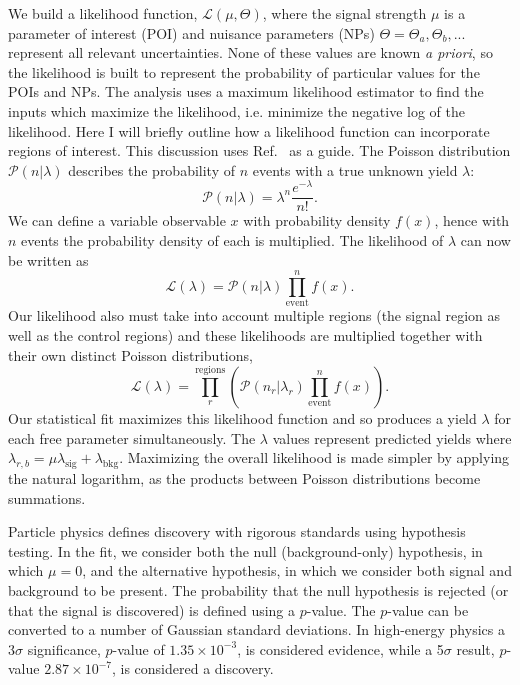 We build a likelihood function, $\mathcal{L}(\mu,\Theta)$, where the signal strength $\mu$ is a parameter of interest (POI) and nuisance parameters (NPs) $\Theta=\Theta_a,\Theta_b,...$ represent all relevant uncertainties. None of these values are known \textit{a priori}, so the likelihood is built to represent the probability of particular values for the POIs and NPs. The analysis uses a maximum likelihood estimator to find the inputs which maximize the likelihood, i.e. minimize the negative log of the likelihood. Here I will briefly outline how a likelihood function can incorporate regions of interest. This discussion uses Ref.~\cite{cranmer2015practical} as a guide. The Poisson distribution $\mathcal{P}(n|\lambda)$ describes the probability of $n$ events with a true unknown yield $\lambda$:
\begin{equation}
\mathcal{P}(n|\lambda)= \lambda^n\frac{e^{-\lambda}}{n!}.
\end{equation}
We can define a variable observable $x$ with probability density $f(x)$, hence with $n$ events the probability density of each is multiplied. The likelihood of $\lambda$ can now be written as
\begin{equation}
\mathcal{L}(\lambda)=\mathcal{P}(n|\lambda)\prod_{\text{event}}^n f(x).
\end{equation}
Our likelihood also must take into account multiple regions (the signal region as well as the control regions) and these likelihoods are multiplied together with their own distinct Poisson distributions,
\begin{equation}
\mathcal{L}(\lambda)=\prod_r^{\text{regions}}(\mathcal{P}(n_r|\lambda_r)\prod_{\text{event}}^n f(x)).
\end{equation}
Our statistical fit maximizes this likelihood function and so produces a yield $\lambda$ for each free parameter simultaneously. The $\lambda$ values represent predicted yields where $\lambda_{r,b} = \mu \lambda_{\text{sig}}+\lambda_{\text{bkg}}$. Maximizing the overall likelihood is made simpler by applying the natural logarithm, as the products between Poisson distributions become summations.  

Particle physics defines discovery with rigorous standards using hypothesis testing. In the fit, we consider both the null (background-only) hypothesis, in which $\mu=0$, and the alternative hypothesis, in which we consider both signal and background to be present. The probability that the null hypothesis is rejected (or that the signal is discovered) is defined using a $p$-value. The $p$-value can be converted to a number of Gaussian standard deviations. In high-energy physics a 3$\sigma$ significance, $p$-value of $1.35 \times 10^{-3}$, is considered evidence, while a 5$\sigma$ result, $p$-value $2.87\times10^{-7}$, is considered a discovery.

